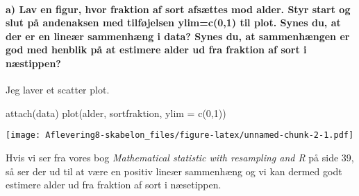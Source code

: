 \documentclass[
]{article}
\newenvironment{Shaded}{\begin{snugshade}}{\end{snugshade}}
\newcommand{\AttributeTok}[1]{\textcolor[rgb]{0.77,0.63,0.00}{#1}}
\newcommand{\DecValTok}[1]{\textcolor[rgb]{0.00,0.00,0.81}{#1}}
\newcommand{\FunctionTok}[1]{\textcolor[rgb]{0.00,0.00,0.00}{#1}}
\newcommand{\NormalTok}[1]{#1}
\begin{document}
\hypertarget{a-lav-en-figur-hvor-fraktion-af-sort-afsuxe6ttes-mod-alder.-styr-start-og-slut-puxe5-andenaksen-med-tilfuxf8jelsen-ylimc01-til-plot.-synes-du-at-der-er-en-lineuxe6r-sammenhuxe6ng-i-data-synes-du-at-sammenhuxe6ngen-er-god-med-henblik-puxe5-at-estimere-alder-ud-fra-fraktion-af-sort-i-nuxe6stippen}{%
\paragraph{a) Lav en figur, hvor fraktion af sort afsættes mod alder.
Styr start og slut på andenaksen med tilføjelsen ylim=c(0,1) til plot.
Synes du, at der er en lineær sammenhæng i data? Synes du, at
sammenhængen er god med henblik på at estimere alder ud fra fraktion af
sort i
næstippen?}\label{a-lav-en-figur-hvor-fraktion-af-sort-afsuxe6ttes-mod-alder.-styr-start-og-slut-puxe5-andenaksen-med-tilfuxf8jelsen-ylimc01-til-plot.-synes-du-at-der-er-en-lineuxe6r-sammenhuxe6ng-i-data-synes-du-at-sammenhuxe6ngen-er-god-med-henblik-puxe5-at-estimere-alder-ud-fra-fraktion-af-sort-i-nuxe6stippen}}

Jeg laver et scatter plot.

\begin{Shaded}
\begin{Highlighting}[]
\FunctionTok{attach}\NormalTok{(data)}
\FunctionTok{plot}\NormalTok{(alder, sortfraktion, }\AttributeTok{ylim =} \FunctionTok{c}\NormalTok{(}\DecValTok{0}\NormalTok{,}\DecValTok{1}\NormalTok{))}
\end{Highlighting}
\end{Shaded}

\texttt{[image: Aflevering8-skabelon\_files/figure-latex/unnamed-chunk-2-1.pdf]}

Hvis vi ser fra vores bog \emph{Mathematical statistic with resampling
and R} på side 39, så ser der ud til at være en positiv lineær
sammenhæng og vi kan dermed godt estimere alder ud fra fraktion af sort
i næsetippen.
\end{document}
